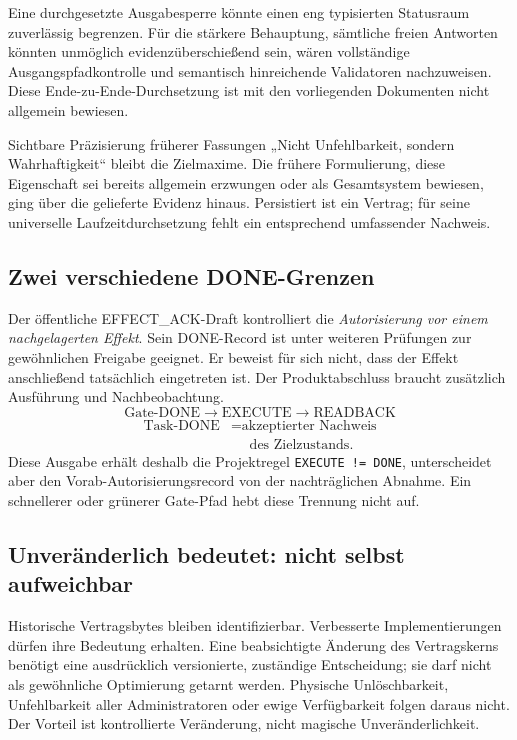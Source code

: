 \begin{cols}
Eine durchgesetzte Ausgabesperre könnte einen eng typisierten Statusraum zuverlässig begrenzen. Für die stärkere Behauptung, sämtliche freien Antworten könnten unmöglich evidenzüberschießend sein, wären vollständige Ausgangspfadkontrolle und semantisch hinreichende Validatoren nachzuweisen. Diese Ende-zu-Ende-Durchsetzung ist mit den vorliegenden Dokumenten nicht allgemein bewiesen.

\begin{boundary}{Sichtbare Präzisierung früherer Fassungen}
„Nicht Unfehlbarkeit, sondern Wahrhaftigkeit“ bleibt die Zielmaxime. Die frühere Formulierung, diese Eigenschaft sei bereits allgemein erzwungen oder als Gesamtsystem bewiesen, ging über die gelieferte Evidenz hinaus. Persistiert ist ein Vertrag; für seine universelle Laufzeitdurchsetzung fehlt ein entsprechend umfassender Nachweis.
\end{boundary}

\subsection*{Zwei verschiedene DONE-Grenzen}
Der öffentliche EFFECT\_ACK-Draft kontrolliert die \emph{Autorisierung vor einem nachgelagerten Effekt}. Sein DONE-Record ist unter weiteren Prüfungen zur gewöhnlichen Freigabe geeignet. Er beweist für sich nicht, dass der Effekt anschließend tatsächlich eingetreten ist. Der Produktabschluss braucht zusätzlich Ausführung und Nachbeobachtung. 
\[
\text{Gate-DONE}\to\text{EXECUTE}\to\text{READBACK}
\]
\[
\begin{aligned}
\text{Task-DONE}&=\text{akzeptierter Nachweis}\\
&\phantom{=}\text{des Zielzustands}.
\end{aligned}
\]
Diese Ausgabe erhält deshalb die Projektregel \texttt{EXECUTE != DONE}, unterscheidet aber den Vorab-Autorisierungsrecord von der nachträglichen Abnahme. Ein schnellerer oder grünerer Gate-Pfad hebt diese Trennung nicht auf.

\subsection*{Unveränderlich bedeutet: nicht selbst aufweichbar}
Historische Vertragsbytes bleiben identifizierbar. Verbesserte Implementierungen dürfen ihre Bedeutung erhalten. Eine beabsichtigte Änderung des Vertragskerns benötigt eine ausdrücklich versionierte, zuständige Entscheidung; sie darf nicht als gewöhnliche Optimierung getarnt werden. Physische Unlöschbarkeit, Unfehlbarkeit aller Administratoren oder ewige Verfügbarkeit folgen daraus nicht. Der Vorteil ist kontrollierte Veränderung, nicht magische Unveränderlichkeit.
\end{cols}

